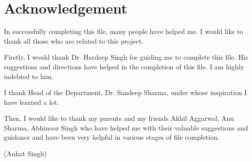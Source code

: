\chapter*{Acknowledgement}

In successfully completing this file, many people have helped me. I would like to thank all those who are related to this project.

Firstly, I would thank Dr. Hardeep Singh for guiding me to complete this file. His suggestions and directions have helped in the completion of this file. I am highly indebted to him.

I thank Head of the Department, Dr. Sandeep Sharma, under whose inspiration I have learned a lot.

Then, I would like to thank my parents and my friends Akhil Aggarwal, Anu Sharma, Abhinoor Singh who have helped me with their valuable suggestions and guidance and have been very helpful in various stages of file completion.
\vspace{2cm}

\begin{flushright}
(Anhat Singh)
\end{flushright}

\afterpage{\blankpage}
